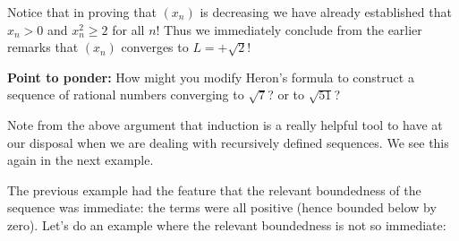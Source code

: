 \documentclass[11pt,dvipsnames]{book}
\numberwithin{figure}{section} %
\numberwithin{table}{section} %
\begin{document}
\begin{example}
Notice that in proving that $(x_n)$ is decreasing we have already established that $x_n > 0$ and $x_n^2 \geq 2$ for all $n$! Thus we immediately conclude from the earlier remarks that $(x_n)$ converges to $L= +\sqrt{2}$!
\end{example}
{\bf Point to ponder:} How might you modify Heron's formula to construct a sequence of rational numbers converging to $\sqrt{7}$? or to $\sqrt{51}$?

Note from the above argument that induction is a really helpful tool to have at our disposal when we are dealing with recursively defined sequences. We see this again in the next example.

The previous example had the feature that the relevant boundedness of the sequence was immediate: the terms were all positive (hence bounded below by zero). Let's do an example where the relevant boundedness is not so immediate:
\end{document}
